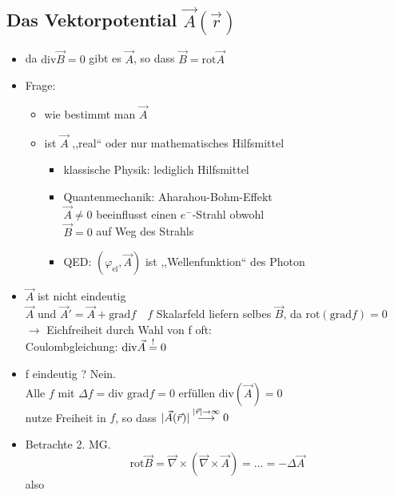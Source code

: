 \documentclass[titlepage,12pt,a4paper,ngerman]{report}
\newcommand{\tx}[1]{\textrm{#1}}
\begin{document}
\subsection{Das Vektorpotential $ \vec{A}(\vec{r}) $}
\begin{itemize}
	\item da $ \tx{div}\vec{B} = 0 $ gibt es $ \vec{A} $, so dass $ \vec{B} = \tx{rot} \vec{A} $
	\item Frage: 
	\begin{itemize}
		\item wie bestimmt man $ \vec{A} $
		\item ist $ \vec{A} $ ,,real`` oder nur mathematisches Hilfsmittel
		\begin{itemize}
			\item klassische Physik: lediglich Hilfsmittel
			\item Quantenmechanik: Aharahou-Bohm-Effekt\\
			$ \vec{A} \neq 0 $ beeinflusst einen $ e^- $-Strahl obwohl\\
			$ \vec{B} = 0 $ auf Weg des Strahls
			\item QED: $ (\varphi_{\tx{el}}, \vec{A}) $ ist ,,Wellenfunktion`` des Photon
		\end{itemize}
	\end{itemize}
	\item $ \vec{A} $ ist nicht eindeutig\\
	$ \vec{A} $ und $ \vec{A}'  = \vec{A} + \tx{grad} f \quad f$ Skalarfeld liefern selbes $ \vec{B} $, da $ \tx{rot} ( \tx{grad}f) = 0 $\\
	$ \rightarrow $  Eichfreiheit durch Wahl von f oft:\\
	Coulombgleichung: $ \tx{div} \vec{A} \buildrel ! \over = 0 $
	\item f eindeutig ? Nein.\\
	Alle $ f $ mit $ \Delta f = \tx{div grad} f = 0 $ erfüllen $ \tx{div}(\vec{A}) = 0 $\\
	nutze Freiheit in $ f $, so dass $ |\vec{A}(\vec{r})| \buildrel |\vec{r}| \rightarrow \infty \over \longrightarrow 0 $
	\item  Betrachte 2. MG.
	$$ \tx{rot} \vec{B} = \vec{\nabla} \times (\vec{\nabla} \times \vec{A}) = \dots = - \Delta \vec{A}$$
	also
	\begin{center}
	\end{center}
\end{itemize}
\end{document}
